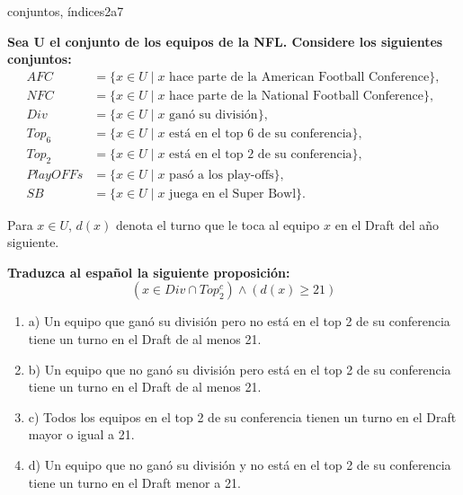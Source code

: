 \documentclass{article}
\begin{document}
\begin{question}{24}{conjuntos, índices}{2}{a}{7}{
\textbf{Sea U el conjunto de los equipos de la NFL. Considere los siguientes conjuntos:}
\[
\begin{aligned}
AFC &= \{ x \in U \mid x \text{ hace parte de la American Football Conference}\},\\
NFC &= \{ x \in U \mid x \text{ hace parte de la National Football Conference}\},\\
Div &= \{ x \in U \mid x \text{ ganó su división}\},\\
Top_6 &= \{ x \in U \mid x \text{ está en el top 6 de su conferencia}\},\\
Top_2 &= \{ x \in U \mid x \text{ está en el top 2 de su conferencia}\},\\
PlayOFFs &= \{ x \in U \mid x \text{ pasó a los play-offs}\},\\
SB &= \{ x \in U \mid x \text{ juega en el Super Bowl}\}.
\end{aligned}
\]

Para $x \in U$, $d(x)$ denota el turno que le toca al equipo $x$ en el Draft del año siguiente. \smallskip

\textbf{Traduzca al español la siguiente proposición:}
\[
(x \in Div \cap Top_2^c)\land(d(x) \geq 21)
\]

\begin{enumerate}
    \item a) Un equipo que ganó su división pero no está en el top 2 de su conferencia tiene un turno en el Draft de al menos 21.  
    \item b) Un equipo que no ganó su división pero está en el top 2 de su conferencia tiene un turno en el Draft de al menos 21.  
    \item c) Todos los equipos en el top 2 de su conferencia tienen un turno en el Draft mayor o igual a 21.  
    \item d) Un equipo que no ganó su división y no está en el top 2 de su conferencia tiene un turno en el Draft menor a 21.  
\end{enumerate}
}
\end{question}
\end{document}
